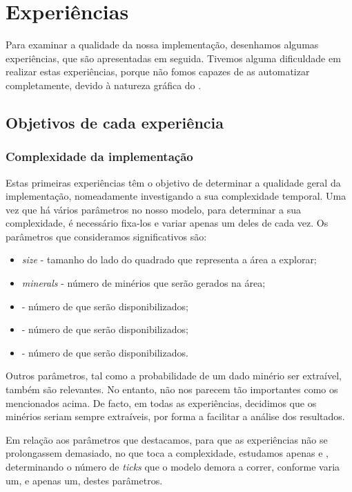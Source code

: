 \documentclass[12pt]{report}
\begin{document}
\chapter{Experiências}

Para examinar a qualidade da nossa implementação, desenhamos algumas experiências, que são apresentadas em seguida. Tivemos alguma dificuldade em realizar estas experiências, porque não fomos capazes de as automatizar completamente, devido à natureza gráfica do \repast.

\section{Objetivos de cada experiência}

\subsection{Complexidade da implementação}

Estas primeiras experiências têm o objetivo de determinar a qualidade geral da implementação, nomeadamente investigando a sua complexidade temporal. Uma vez que há vários parâmetros no nosso modelo, para determinar a sua complexidade, é necessário fixa-los e variar apenas um deles de cada vez. Os parâmetros que consideramos significativos são:
\begin{itemize}
	\item \emph{size} - tamanho do lado do quadrado que representa a área a explorar;
	\item \emph{minerals} - número de minérios que serão gerados na área;
	\item \spotters - número de \spotters que serão disponibilizados;
	\item \producers - número de \producers que serão disponibilizados;
	\item \transporters - número de \transporters que serão disponibilizados.
\end{itemize}

Outros parâmetros, tal como a probabilidade de um dado minério ser extraível, também são relevantes. No entanto, não nos parecem tão importantes como os mencionados acima. De facto, em todas as experiências, decidimos que os minérios seriam sempre extraíveis, por forma a facilitar a análise dos resultados. 

Em relação aos parâmetros que destacamos, para que as experiências não se prolongassem demasiado, no que toca a complexidade, estudamos apenas \size e \minerals, determinando o número de \emph{ticks} que o modelo demora a correr, conforme varia um, e apenas um, destes parâmetros.
\end{document}
